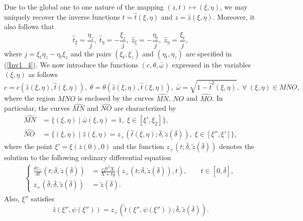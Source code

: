 \documentclass[3p,11pt]{elsarticle}
\numberwithin{equation}{section}
\begin{document}
Due to the global one to one nature of the mapping $(z,t)\mapsto(\xi,\eta)$, we may uniquely recover the inverse functions $t=\hat t(\xi,\eta)$ and $z=\hat z(\xi,\eta)$. Moreover, it also follows that
\begin{equation}\label{main_1}
    \hat t_\xi =\frac{\eta_z}{j},\; \hat t_\eta =-\frac{\xi_z}{j},\;
     \hat z_\xi =-\frac{\eta_t}{j},\; \hat z_\eta =\frac{\xi_t}{j},
\end{equation}
where $j=\xi_{t}\eta_{z}-\eta_{t}\xi_{z}$ and the pairs $(\xi_{t},\xi_{z})$ and $(\eta_{t},\eta_{z})$ are specified in (\ref{Inv1_4}). We now introduce the functions $(c,\theta,\bar\omega)$ expressed in the variables $(\xi,\eta)$ as follows
\begin{equation}\label{main_2}
    c=c(\hat z(\xi,\eta), \hat t(\xi,\eta)), \; \theta=\theta(\hat z(\xi,\eta), \hat t(\xi,\eta)),\; \bar\omega =\sqrt{1-\hat t^2(\xi,\eta)},\; \forall\; (\xi,\eta)\in \overline{MNO},
\end{equation}
where the region $MNO$ is enclosed by the curves $\widehat{MN}$, $\widehat{NO}$ and $\widehat{MO}$. In particular, the curves $\widehat{MN}$ and $\widehat{NO}$ are characterized by
\begin{equation}\label{main_4}
    \begin{split}
        \widehat{MN}&=\{(\xi,\eta)\;| \; \bar\omega(\xi,\eta)=1, \;\xi\in[\xi',\xi_2]\},\\
        \widehat{NO}&=\{(\xi,\eta)\;| \; \hat z(\xi,\eta)=z_+(\hat t(\xi,\eta); \bar\delta, \tilde z(\bar\delta)), \; \xi\in[\xi'',\xi']\},
    \end{split}
\end{equation}
where the point $\xi'=\xi(\bar z(0),0)$ and the function $z_{+}(t;\bar{\delta},\tilde z(\bar{\delta}))$ denotes the solution to the following ordinary differential equation
\begin{equation}\label{main_5}
    \begin{split}
        \begin{cases}
            \frac{dz_+}{dt}(t; \bar\delta, \tilde z(\bar{\delta}))&=\frac{cft^2 X}{ X+tg}(z_+(t; \bar\delta, \tilde z(\bar{\delta})),t),\;\;\;\;\; \;\;t\in[0,\bar\delta],\\
        z_+(\bar\delta; \bar\delta, \tilde z(\bar{\delta})) &=\tilde z(\bar\delta).
        \end{cases}
    \end{split}
\end{equation}
Also, $\xi''$ satisfies
\begin{equation*}\label{main_6}
    \hat z(\xi'',\psi(\xi''))=z_+(\tilde t(\xi'',\psi(\xi'')); \bar\delta,\tilde z(\bar\delta)).
\end{equation*}
\end{document}
